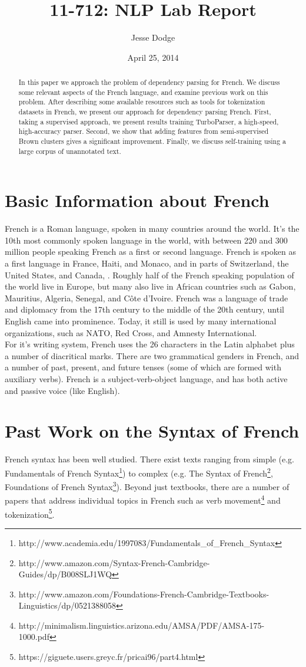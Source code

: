 \documentclass[11pt,letterpaper]{article}
\title{11-712:  NLP Lab Report}
\author{Jesse Dodge}
\date{April 25, 2014}
\begin{document}
\maketitle
\begin{abstract}
In this paper we approach the problem of dependency parsing for French. We discuss some relevant aspects of the French language, and examine previous work on this problem. After describing some available resources such as tools for tokenization datasets in French, we present our approach for dependency parsing French. First, taking a supervised approach, we present results training TurboParser, a high-speed, high-accuracy parser. Second, we show that adding features from semi-supervised Brown clusters gives a significant improvement. Finally, we discuss self-training using a large corpus of unannotated text. 
\end{abstract}

\section{Basic Information about French}
French is a Roman language, spoken in many countries around the world. It's the 10th most commonly spoken language in the world, with between 220 and 300 million people speaking French as a first or second language. French is spoken as a first language in France, Haiti, and Monaco, and in parts of Switzerland, the United States, and Canada, . Roughly half of the French speaking population of the world live in Europe, but many also live in African countries such as Gabon, Mauritius, Algeria, Senegal, and Côte d'Ivoire. French was a language of trade and diplomacy from the 17th century to the middle of the 20th century, until English came into prominence. Today, it still is used by many international organizations, such as NATO, Red Cross, and Amnesty International. \\
For it's writing system, French uses the 26 characters in the Latin alphabet plus a number of diacritical marks. There are two grammatical genders in French, and a number of past, present, and future tenses (some of which are formed with auxiliary verbs). French is a subject-verb-object language, and has both active and passive voice (like English).

\section{Past Work on the Syntax of French}
French syntax has been well studied. There exist texts ranging from simple (e.g. Fundamentals of French Syntax\footnote{http://www.academia.edu/1997083/Fundamentals\_of\_French\_Syntax}) to complex (e.g. The Syntax of French\footnote{http://www.amazon.com/Syntax-French-Cambridge-Guides/dp/B008SLJ1WQ}, Foundations of French Syntax\footnote{http://www.amazon.com/Foundations-French-Cambridge-Textbooks-Linguistics/dp/0521388058}). Beyond just textbooks, there are a number of papers that address individual topics in French such as verb movement\footnote{http://minimalism.linguistics.arizona.edu/AMSA/PDF/AMSA-175-1000.pdf} and tokenization\footnote{https://giguete.users.greyc.fr/pricai96/part4.html}.
\end{document}
